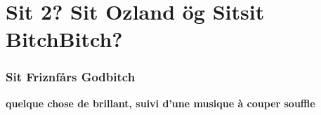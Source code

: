 \chapter*{Sit 2? Sit Ozland ög Sitsit BitchBitch?}

\subsection*{Sit Friznfårs Godbitch}
\begin{center}\textbf{quelque chose de brillant, suivi d'une musique à
couper souffle}\end{center}
